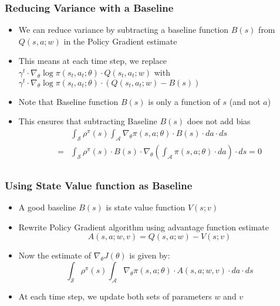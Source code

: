 \documentclass[handout]{beamer}
\begin{document}
\begin{frame}
\frametitle{Reducing Variance with a Baseline}
\pause
\begin{itemize}[<+->]
\item We can reduce variance by subtracting a baseline function $B(s)$ from $Q(s,a;w)$ in the Policy Gradient estimate
\item This means at each time step, we replace $\gamma^t \cdot \nabla_{\theta} \log \pi(s_t,a_t; \theta) \cdot Q(s_t,a_t; w)$ with $\gamma^t \cdot \nabla_{\theta} \log \pi(s_t,a_t; \theta) \cdot (Q(s_t,a_t; w) - B(s))$
\item Note that Baseline function $B(s)$ is only a function of $s$ (and not $a$)
\item This ensures that subtracting Baseline $B(s)$ does not add bias
\begin{align*}
& \int_{\mathcal{S}} \rho^{\pi}(s) \int_{\mathcal{A}} \nabla_{\theta} \pi(s,a; \theta) \cdot B(s)\cdot da \cdot ds\\
 = & \int_{\mathcal{S}} \rho^{\pi}(s) \cdot B(s) \cdot \nabla_{\theta} (\int_{\mathcal{A}} \pi(s,a; \theta) \cdot da) \cdot ds = 0\\
\end{align*}
\end{itemize}
\end{frame}

\begin{frame}
\frametitle{Using State Value function as Baseline}
\pause
\begin{itemize}[<+->]
\item A good baseline $B(s)$ is state value function $V(s;v)$
\item Rewrite Policy Gradient algorithm using advantage function estimate
$$A(s,a;w,v) = Q(s,a;w) - V(s; v)$$
\item Now the estimate of $\nabla_{\theta} J(\theta)$ is given by:
$$\int_{\mathcal{S}} \rho^{\pi}(s) \int_{\mathcal{A}} \nabla_{\theta} \pi(s, a; \theta) \cdot A(s,a; w, v) \cdot da \cdot ds $$
\item At each time step, we update both sets of parameters $w$ and $v$
\end{itemize}
\end{frame}
\end{document}
